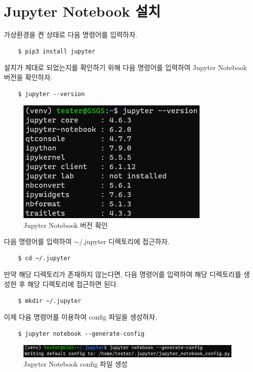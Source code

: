 \section{Jupyter Notebook 설치}
\label{jupyter}
가상환경을 켠 상태로 다음 명령어를 입력하자.
\begin{lstlisting}
    $ pip3 install jupyter
\end{lstlisting}
설치가 제대로 되었는지를 확인하기 위해 다음 명령어를 입력하여 Jupyter Notebook 버전을 확인하자.
\begin{lstlisting}
    $ jupyter --version
\end{lstlisting}

\begin{figure}[H]
	\begin{center}
        \includegraphics[width=0.4\linewidth]{jupyter_version}
        \caption{Jupyter Notebook 버전 확인}
    \end{center}
\end{figure}

다음 명령어를 입력하여 $\sim$/.jupyter 디렉토리에 접근하자.
\begin{lstlisting}
    $ cd ~/.jupyter
\end{lstlisting}
만약 해당 디렉토리가 존재하지 않는다면, 다음 명령어를 입력하여 해당 디렉토리를 생성한 후 해당 디렉토리에 접근하면 된다.
\begin{lstlisting}
    $ mkdir ~/.jupyter
\end{lstlisting}
이제 다음 명령어를 이용하여 config 파일을 생성하자.
\begin{lstlisting}
    $ jupyter notebook --generate-config
\end{lstlisting}

\begin{figure}[H]
	\begin{center}
        \includegraphics[width=0.8\linewidth]{jupyter_config_generation}
        \caption{Jupyter Notebook config 파일 생성}
    \end{center}
\end{figure}

